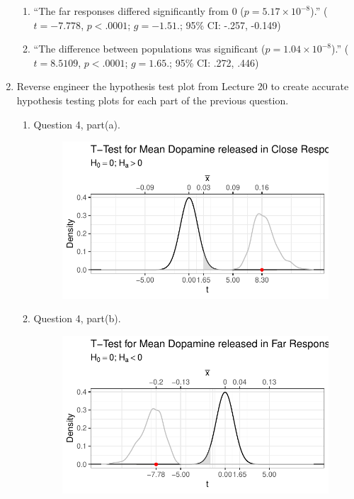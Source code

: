 \documentclass{article}\usepackage[]{graphicx}\usepackage[]{xcolor}
\begin{document}
\begin{enumerate}
\begin{enumerate}
  \item ``The far responses differed significantly from 0 ($p=5.17 \times 10^{-8}$).''
   ($t=-7.778$, $p < .0001$; $g=-1.51.$; 95\% CI: -.257, -0.149)
  \item ``The difference between populations was significant ($p=1.04 \times10^{-8}$).''
   ($t=8.5109$, $p < .0001$; $g=1.65.$; 95\% CI: .272, .446)
\end{enumerate}
\item Reverse engineer the hypothesis test plot from Lecture 20 to create accurate
hypothesis testing plots for each part of the previous question.
\begin{enumerate}
  \item Question 4, part(a).
     \begin{figure}[H]
  \begin{center}
    \includegraphics[scale=0.5]{closerg.pdf}
    \caption{}
    \label{moe}
  \end{center}
\end{figure}
  \item Question 4, part(b).
     \begin{figure}[H]
  \begin{center}
    \includegraphics[scale=0.5]{fartherg.pdf}

\end{center}
\end{figure}
\end{enumerate}
\end{enumerate}
\end{document}
